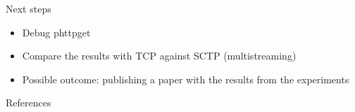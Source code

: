 \documentclass[t,xcolor=dvipsnames,english,bigger,aspectratio=43,hyperref={unicode=true}]{beamer}
\begin{document}
\begin{frame}{Next steps}
\begin{itemize}
\item Debug phttpget 
\item Compare the results with TCP against SCTP (multistreaming)
\item Possible outcome: publishing a paper with the results from the experiments
\end{itemize}
\end{frame}
\begin{frame}{References}
\tiny


\end{frame}
\end{document}
